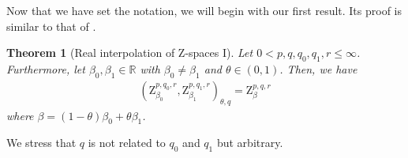 \documentclass[11pt, leqno,parskip=half]{amsart}
\newtheorem{theorem}{Theorem}[section]
\theoremstyle{definition}
\newcommand{\IR}{\mathbb{R}}
\newcommand{\Z}{\mathrm{Z}}
\numberwithin{equation}{section}
\begin{document}
Now that we have set the notation, we will begin with our first result. Its proof is similar to that of \cite[Thm.\@ 2.4.2]{Triebel1}.

\begin{theorem}[Real interpolation of $\Z$-spaces I]
\label{thm: real int of Z-spaces}
    Let $0< p,q, q_0,q_1, r\leq \infty$. Furthermore, let $\beta_0,\beta_1\in\IR$ with $\beta_0\neq \beta_1$ and $\theta\in (0,1)$. Then, we have
    \begin{align*}
        (\Z^{p,q_0,r}_{\beta_0} , \Z^{p,q_1,r}_{\beta_1} )_{\theta, q} = \Z^{p, q,r}_{\beta}
    \end{align*}
    where $\beta = (1-\theta)\beta_0 + \theta \beta_1$.
\end{theorem}

\noindent We stress that $q$ is not related to $q_0$ and $q_1$ but arbitrary.
\end{document}
